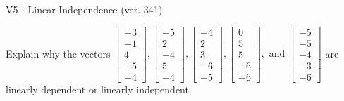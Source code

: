 \begin{exercise}
  \begin{exerciseTitle}V5 - Linear Independence (ver. 341)\end{exerciseTitle}
  \begin{exerciseStatement}
    Explain why the vectors \(\left[\begin{array}{r}
-3 \\
-1 \\
4 \\
-5 \\
-4
\end{array}\right] , \left[\begin{array}{r}
-5 \\
2 \\
-4 \\
5 \\
-4
\end{array}\right] , \left[\begin{array}{r}
-4 \\
2 \\
3 \\
-6 \\
-5
\end{array}\right] , \left[\begin{array}{r}
0 \\
5 \\
5 \\
-6 \\
-6
\end{array}\right] , \text{ and } \left[\begin{array}{r}
-5 \\
-5 \\
-4 \\
-3 \\
-6
\end{array}\right]\) are linearly dependent or linearly independent.	



\end{exerciseStatement}
\end{exercise}
